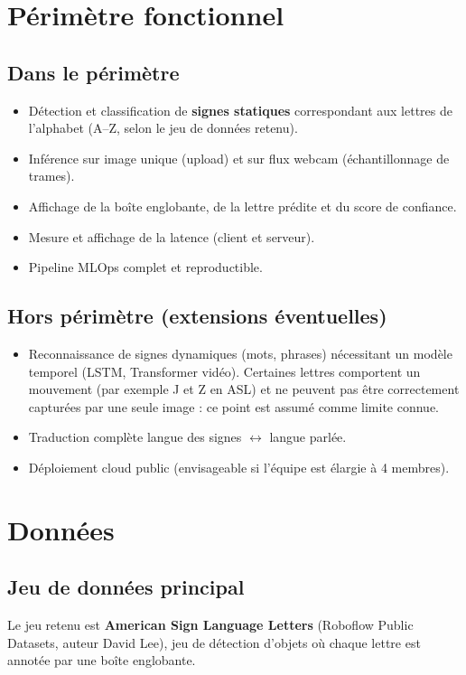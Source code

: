 \documentclass[11pt,a4paper]{article}
\begin{document}
\section{Périmètre fonctionnel}

\subsection{Dans le périmètre}
\begin{itemize}[leftmargin=*]
  \item Détection et classification de \textbf{signes statiques} correspondant aux lettres de l'alphabet (A--Z, selon le jeu de données retenu).
  \item Inférence sur image unique (upload) et sur flux webcam (échantillonnage de trames).
  \item Affichage de la boîte englobante, de la lettre prédite et du score de confiance.
  \item Mesure et affichage de la latence (client et serveur).
  \item Pipeline MLOps complet et reproductible.
\end{itemize}

\subsection{Hors périmètre (extensions éventuelles)}
\begin{itemize}[leftmargin=*]
  \item Reconnaissance de signes dynamiques (mots, phrases) nécessitant un modèle temporel (LSTM, Transformer vidéo). Certaines lettres comportent un mouvement (par exemple J et Z en ASL) et ne peuvent pas être correctement capturées par une seule image : ce point est assumé comme limite connue.
  \item Traduction complète langue des signes $\leftrightarrow$ langue parlée.
  \item Déploiement cloud public (envisageable si l'équipe est élargie à 4 membres).
\end{itemize}

\section{Données}

\subsection{Jeu de données principal}
Le jeu retenu est \textbf{American Sign Language Letters} (Roboflow Public Datasets, auteur David Lee), jeu de détection d'objets où chaque lettre est annotée par une boîte englobante.
\end{document}
